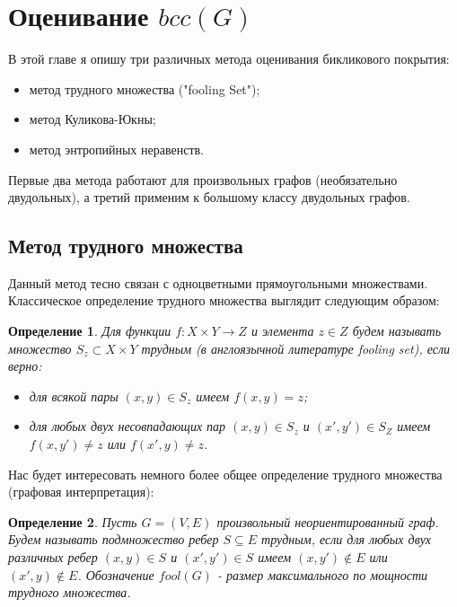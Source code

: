 \documentclass[a4paper]{article}
\newtheorem*{mdefinition}{Определение}
\begin{document}
\addtocounter{section}{1}
\section*{Оценивание $bcc(G)$}

В этой главе я опишу три различных метода оценивания бикликового покрытия:
\begin{itemize}[noitemsep]
	\item метод трудного множества ("fooling Set");
	\item метод Куликова-Юкны;
	\item метод энтропийных неравенств.
\end{itemize}

Первые два метода работают для произвольных графов (необязательно двудольных), а третий применим к 
большому классу двудольных графов.

\setcounter{subsection}{0}

\subsection{Метод трудного множества}

Данный метод тесно связан с одноцветными прямоугольными множествами. Классическое определение 
трудного множества выглядит следующим образом:

\begin{mdefinition}
	Для функции $f: X\times Y \rightarrow Z$ и элемента $z\in Z$ будем называть множество 
	$S_z\subset X\times Y$ трудным (в англоязычной литературе fooling set), если верно:
	\begin{itemize}[noitemsep]
		\item для всякой пары $(x, y)\in S_z$ имеем $f(x, y) = z$;
		\item для любых двух несовпадающих пар $(x, y)\in S_z$ и $(x', y')\in S_Z$ имеем 
		$f(x, y') \neq z$ или $f(x', y) \neq z$.
	\end{itemize}
\end{mdefinition}

Нас будет интересовать немного более общее определение трудного множества (графовая интерпретация):
\begin{mdefinition}
	Пусть $G = (V, E)$ произвольный неориентированный граф. Будем называть подмножество ребер 
	$S \subseteq E$ трудным, если для любых двух различных ребер $(x, y)\in S$ и $(x', y')\in S$ 
	имеем $(x, y') \notin E$ или $(x', y) \notin E$. Обозначение $fool(G)$ - размер максимального по 
	мощности трудного множества.
\end{mdefinition}
\end{document}
